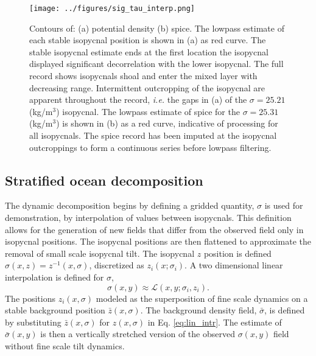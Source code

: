 \documentclass[preprint,NumberedRefs]{JASA}
\begin{document}
\begin{figure}
\texttt{[image: ../figures/sig\_tau\_interp.png]}
    \caption{\label{fig:cntrs}{Contours of: (a) potential density (b) spice. The lowpass estimate of each stable isopycnal position is shown in (a) as red curve. The stable isopycnal estimate ends at the first location the isopycnal displayed significant decorrelation with the lower isopycnal. The full record shows isopycnals shoal and enter the mixed layer with decreasing range.  Intermittent outcropping of the isopycnal are apparent throughout the record, \emph{i.e.} the gaps in (a) of the $\sigma=25.21$ (kg/m$^3$) isopycnal. The lowpass estimate of spice for the $\sigma=25.31$ (kg/m$^3$) is shown in (b) as a red curve, indicative of processing for all isopycnals. The spice record has been imputed at the isopycnal outcroppings to form a continuous series before lowpass filtering.}}
\end{figure}

\subsection{Stratified ocean decomposition}
The dynamic decomposition begins by defining a gridded quantity, $\sigma$ is used for demonstration, by interpolation of values between isopycnals. This definition allows for the generation of new fields that differ from the observed field only in isopycnal positions. The isopycnal positions are then flattened to approximate the removal of small scale isopycnal tilt. The isopycnal $z$ position is defined $\sigma(x, z) = z^{-1}(x, \sigma)$, discretized as $z_i(x; \sigma_i)$. A two dimensional linear interpolation is defined for $\sigma$,
\begin{equation}
    \sigma(x,y)\approx\mathcal{L}(x, y; \sigma_i, z_i).
    \label{eq:lin_intr}
\end{equation}
The positions $z_i(x, \sigma)$ modeled as the superposition of fine scale dynamics on a stable background position $\bar{z}(x, \sigma)$. The background density field, $\bar{\sigma}$, is defined by substituting $\bar{z}(x, \sigma)$ for $z(x, \sigma)$ in Eq. \eqref{eq:lin_intr}. The estimate of $\bar{\sigma}(x,y)$ is then a vertically stretched version of the observed $\sigma(x,y)$ field without fine scale tilt dynamics.
\end{document}
